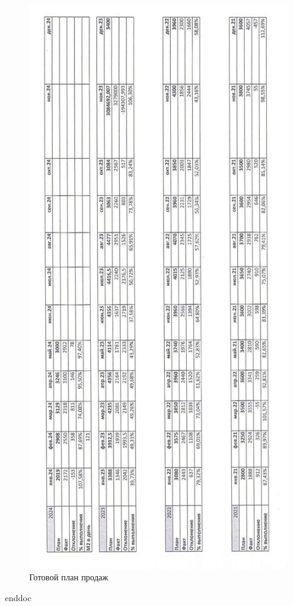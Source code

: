 % 
\begin{figure}
\begin{center}
 \includegraphics[height=0.8\textheight, width=1.3\textwidth, angle=0, keepaspectratio]{Pics/d02.jpg}
\end{center}
 \caption{Готовой план продаж}
 \label{pic:d2}
\end{figure}
\clearpage


 {enddoc}